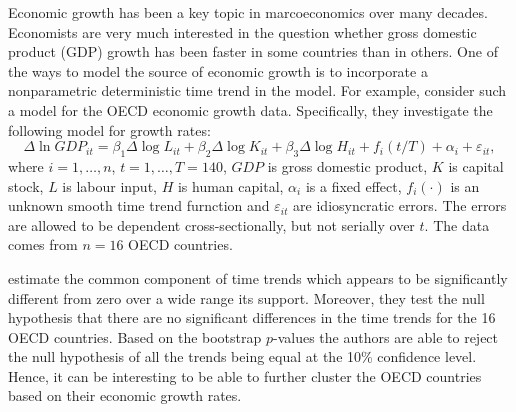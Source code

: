 \documentclass[a4paper,12pt]{article}
\begin{document}
\begin{itemize}[label=--,leftmargin=0.5cm]
\begin{example}
Economic growth has been a key topic in marcoeconomics over many decades. Economists are very much interested in the question whether gross domestic product (GDP) growth  has been faster in some countries than in others. One of the ways to model the source of economic growth is to incorporate a nonparametric deterministic time trend in the model. For example, \cite{Zhang2012} consider such a model for the OECD economic growth data. Specifically, they investigate the following model for growth rates:
\begin{equation}\label{model-zhang}
\Delta \ln GDP_{it} = \beta_1 \Delta \log L_{it} +\beta_2 \Delta \log K_{it} +\beta_3 \Delta \log H_{it} +f_i(t/T) +\alpha_i + \varepsilon_{it},
\end{equation}
where $i = 1,\ldots, n$, $t = 1, \ldots, T = 140$, $GDP$ is gross domestic product, $K$ is capital stock, $L$ is labour input, $H$ is human capital, $\alpha_i$ is a fixed effect, $f_i(\cdot)$ is an unknown smooth time trend furnction and $\varepsilon_{it}$ are idiosyncratic errors. The errors are allowed to be dependent cross-sectionally, but not serially over $t$. The data comes from $n = 16$ OECD countries.

\cite{Zhang2012} estimate the common component of time trends which appears to be significantly different from zero over a wide range its support. Moreover, they test the null hypothesis that there are no significant differences in the time trends for the 16 OECD countries. Based on the bootstrap $p$-values the authors are able to reject the null hypothesis of all the trends being equal at the 10\% confidence level. Hence, it can be interesting to be able to further cluster the OECD countries based on their economic growth rates.
\end{example}


\end{itemize}
\end{document}
